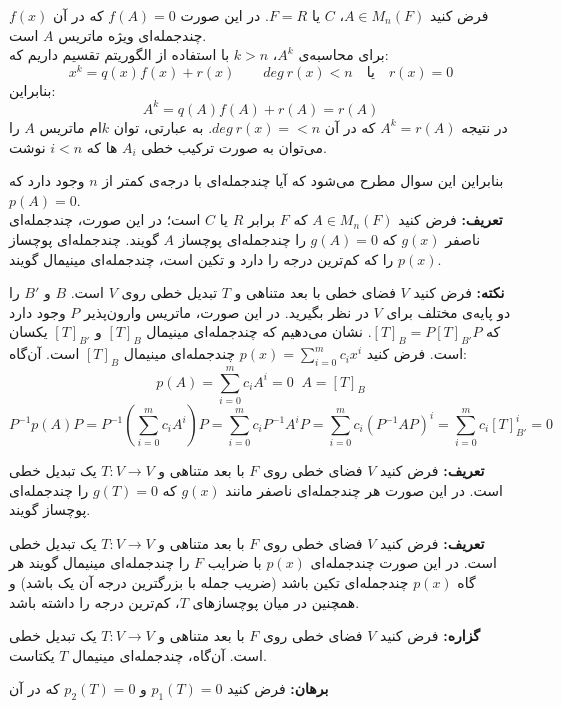 
فرض کنید $A\in M_n(F)$، $F = R \text{ یا }C$. در این صورت $f(A) = 0$ که در آن $f(x)$ چند‌جمله‌ای ویژه ماتریس $A$ است.\\
برای محاسبه‌ی $A^k$، $k> n$ با استفاده از الگوریتم تقسیم داریم که:
$$x^k = q(x) f(x) +r(x) \quad\quad deg \: r(x)<n \quad \text{یا} \quad r(x) = 0$$
بنابراین:
$$A^k = q(A)f(A) +r(A)= r(A)$$
در نتیجه $A^k = r(A)$ که در آن $deg\: r(x) =<n$. به عبارتی، توان $k$ام ماتریس $A$ را می‌توان به صورت ترکیب خطی $A_i$ ها که $i<n$ نوشت.


بنابراین این سوال مطرح می‌شود که آیا چند‌جمله‌ای با درجه‌ی کمتر از $n$ وجود دارد که $p(A) = 0$.\\

\textbf{تعریف:}
فرض کنید $A\in M_n(F)$ که $F$ برابر $R$ یا $C$ است؛ در این صورت، چندجمله‌ای ناصفر $g(x)$ که $g(A)=0$ را چندجمله‌ای پوچساز $A$ گویند. چندجمله‌ای پوچساز $p(x)$ را که کم‌ترین درجه را دارد و تکین است، چندجمله‌ای مینیمال گویند.


\textbf{نکته:}
فرض کنید $V$ فضای خطی با بعد متناهی و $T$ تبدیل خطی روی $V$ است. $B$ و $B'$ را دو پایه‌ی مختلف برای $V$ در نظر بگیرید. در این صورت، ماتریس وارون‌پذیر $P$ وجود دارد که $[T]_B=P[T]_{B'}P$. نشان می‌دهیم که چندجمله‌ای مینیمال $[T]_B$ و $[T]_{B'}$ یکسان است. فرض کنید
$p(x)=\sum_{i=0}^m c_i x^i$
چندجمله‌ای مینیمال $[T]_B$ است. آن‌گاه:
$$p(A)=\sum_{i=0}^m c_i A^i=0 \; \; A = [T]_B$$
$$ P^{-1}p(A)P = P^{-1}(\sum_{i=0}^m c_i A^i)P=\sum_{i=0}^m c_i P^{-1} A^i  P = \sum_{i=0}^m c_i ( P^{-1} A  P)^i = \sum_{i=0}^m c_i [T]_{B'}^i=0$$


\textbf{تعریف:} فرض کنید $V$ فضا‌ی خطی روی $F$ با بعد متناهی و $T:V\rightarrow V$ یک تبدیل خطی است. در این صورت هر چندجمله‌ای ناصفر مانند $g(x)$ که $g(T)=0$ را چندجمله‌ای پوچساز گویند.


\textbf{تعریف:} فرض کنید $V$ فضا‌ی خطی روی $F$ با بعد متناهی و $T:V\rightarrow V$ یک تبدیل خطی است. در این صورت چند‌جمله‌ای $p(x)$ با ضرایب $F$ را چند‌جمله‌ای مینیمال گویند هر گاه $p(x)$ چند‌جمله‌ای تکین باشد (ضریب جمله با بزرگترین درجه آن یک باشد) و همچنین
در میان پوچسازهای $T$، کم‌ترین درجه را داشته باشد.


\textbf{گزاره:}
فرض کنید $V$  فضای خطی روی $F$ با بعد متناهی و
$T:V\to V$
یک تبدیل خطی است. آن‌گاه، چندجمله‌ای مینیمال $T$ یکتاست.

\textbf{برهان:}
فرض کنید $p_1(T)=0$ و $p_2(T)=0$
که در آن

